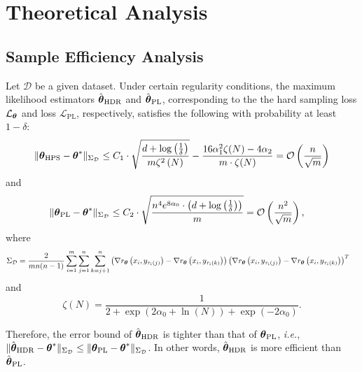 \section{Theoretical Analysis}
\label{sec:proof}
\subsection{Sample Efficiency Analysis}
\label{sec:proof1}
\begin{theorem*}
Let \(\mathcal{D}\) be a given dataset. Under certain regularity conditions, the maximum likelihood estimators \(\hat{{\boldsymbol{\theta}}}_{\text{HDR}}\) and \(\hat{{\boldsymbol{\theta}}}_{\text{PL}}\), corresponding to the the hard sampling loss $\mathcal{L}_{{\boldsymbol{\theta}}}$ and  loss $\mathcal{L}_{\text{PL}}$, respectively, satisfies the following with probability at least $1-\delta$:
\begin{equation*}
\begin{aligned}
\|{\boldsymbol{\theta}}_{\text{HPS}}-{\boldsymbol{\theta}}^{*}\|_{{\Sigma}_{\mathcal{D}}}\leq C_{1}\cdot\sqrt{\frac{d+\log\left(\frac{1}{\delta}\right)}{m\zeta^{2}\left(N\right)}}-\frac{16\alpha_{1}^{2}\zeta(N)-4\alpha_{2}}{m\cdot\zeta(N)}=\mathcal{O}\left(\frac{n}{\sqrt{m}}\right)
\end{aligned}
\end{equation*}
and
\begin{equation*}
\begin{aligned}
&\|\boldsymbol{\theta}_{\text{\text{PL}}}-{\boldsymbol{\theta}}^{*}\|_{{\Sigma}_{\mathcal{D}}}\leq C_{2}\cdot\sqrt{\frac{ n^{4}e^{8\alpha_{0}}\cdot\left(d+\log\left(\frac{1}{\delta}\right)\right)}{m}}=\mathcal{O}\left(\frac{n^{2}}{\sqrt{m}}\right),
\end{aligned}
\end{equation*}
where
\begin{equation*}
\begin{aligned}
&\Sigma_{\mathcal{D}}=\frac{2}{mn(n-1)}\sum\limits_{i=1}^{m}\sum\limits_{j=1}^{n}\sum\limits_{k=j+1}^{n}\left(\nabla r_{{\boldsymbol{\theta}}}\left(x_{i},y_{\tau_{i}\left( j\right)}\right)-\nabla r_{{\boldsymbol{\theta}}}\left(x_{i},y_{\tau_{i}\left( k\right)}\right)\right)\left(\nabla r_{{\boldsymbol{\theta}}}\left(x_{i},y_{\tau_{i}\left( j\right)}\right)-\nabla r_{{\boldsymbol{\theta}}}\left(x_{i},y_{\tau_{i}\left( k\right)}\right)\right)^{T}
\end{aligned}
\end{equation*}
and
\begin{equation*}
\zeta\left(N\right)=\frac{1}{2+\exp\left(2\alpha_{0}+\ln(N)\right)+\exp\left(-2\alpha_{0}\right)}.
\end{equation*}

Therefore, the error bound of $\hat{{\boldsymbol{\theta}}}_{\text{HDR}}$ is tighter than that of $\boldsymbol{\theta}_{\text{\text{PL}}}$, \textit{i.e.}, $\|\hat{{\boldsymbol{\theta}}}_{\text{HDR}}-{\boldsymbol{\theta}}^{*}\|_{\Sigma_{\mathcal{D}}}\leq \|\boldsymbol{\theta}_{\text{\text{PL}}}-{\boldsymbol{\theta}}^{*}\|_{\Sigma_{\mathcal{D}}}$. In other words, \(\hat{{\boldsymbol{\theta}}}_{\text{HDR}}\) is more efficient than \(\hat{{\boldsymbol{\theta}}}_{\text{PL}}\).
\end{theorem*}

